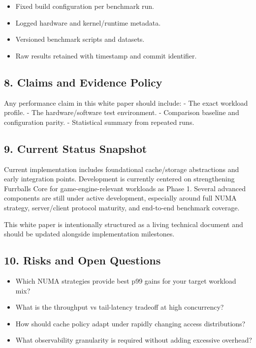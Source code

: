\documentclass[
  english,
  letterpaper,
  DIV=11,
  numbers=noendperiod]{scrartcl}
\providecommand{\tightlist}{%
  \setlength{\itemsep}{0pt}\setlength{\parskip}{0pt}}
\begin{document}
\begin{itemize}
\tightlist
\item
  Fixed build configuration per benchmark run.
\item
  Logged hardware and kernel/runtime metadata.
\item
  Versioned benchmark scripts and datasets.
\item
  Raw results retained with timestamp and commit identifier.
\end{itemize}

\subsection{8. Claims and Evidence
Policy}\label{claims-and-evidence-policy}

Any performance claim in this white paper should include: - The exact
workload profile. - The hardware/software test environment. - Comparison
baseline and configuration parity. - Statistical summary from repeated
runs.

\subsection{9. Current Status Snapshot}\label{current-status-snapshot}

Current implementation includes foundational cache/storage abstractions
and early integration points. Development is currently centered on
strengthening Furrballs Core for game-engine-relevant workloads as Phase
1. Several advanced components are still under active development,
especially around full NUMA strategy, server/client protocol maturity,
and end-to-end benchmark coverage.

This white paper is intentionally structured as a living technical
document and should be updated alongside implementation milestones.

\subsection{10. Risks and Open
Questions}\label{risks-and-open-questions}

\begin{itemize}
\tightlist
\item
  Which NUMA strategies provide best p99 gains for your target workload
  mix?
\item
  What is the throughput vs tail-latency tradeoff at high concurrency?
\item
  How should cache policy adapt under rapidly changing access
  distributions?
\item
  What observability granularity is required without adding excessive
  overhead?
\end{itemize}
\end{document}

